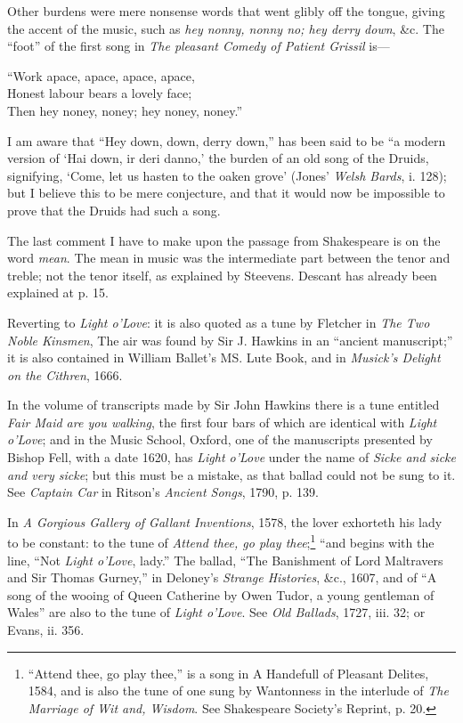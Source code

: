 Other burdens were mere nonsense words that went glibly off the tongue, giving
the accent of the music, such as \textit{hey nonny, nonny no; hey derry down}, \&c. The
“foot” of the first song in \textit{The pleasant Comedy of Patient Grissil} is—
\begin{scverse}
“Work apace, apace, apace, apace,\\
Honest labour bears a lovely face;\\
Then hey noney, noney; hey noney, noney.”
\end{scverse}
I am aware that “Hey down, down, derry down,” has been said to be “a modern
version of ‘Hai down, ir deri danno,’ the burden of an old song of the Druids,
signifying, ‘Come, let us hasten to the oaken grove’ (Jones’ \textit{Welsh Bards}, i. 128);
but I believe this to be mere conjecture, and that it would now be impossible to
prove that the Druids had such a song.

The last comment I have to make upon the passage from Shakespeare is on the
word \textit{mean}. The mean in music was the intermediate part between the tenor and
treble; not the tenor itself, as explained by Steevens. Descant has already been
explained at p. 15.

Reverting to \textit{Light o’Love}: it is also quoted as a tune by Fletcher in \textit{The Two
Noble Kinsmen}, The air was found by Sir J. Hawkins in an “ancient manuscript;” 
it is also contained in William Ballet’s MS. Lute Book, and in \textit{Musick’s
Delight on the Cithren}, 1666.

In the volume of transcripts made by Sir John Hawkins there is a tune entitled
\textit{Fair Maid are you walking}, the first four bars of which are identical with \textit{Light
o'Love}; and in the Music School, Oxford, one of the manuscripts presented by
Bishop Fell, with a date 1620, has \textit{Light o'Love} under the name of \textit{Sicke and sicke
and very sicke}; but this must be a mistake, as that ballad could not be sung to it.
See \textit{Captain Car} in Ritson’s \textit{Ancient Songs}, 1790, p. 139.

In \textit{A Gorgious Gallery of Gallant Inventions}, 1578, the lover exhorteth his
lady to be constant: to the tune of \textit{Attend thee, go play thee};\footnote{\textit{}
“Attend thee, go play thee,” is a song in A Hand\-efull
of Pleasant Delites, 1584, and is also the tune of one sung
by Wantonness in the interlude of \textit{The Marriage of Wit
and, Wisdom}. See Shakespeare Society’s Reprint, p. 20.}
 “and begins with
the line, “Not \textit{Light o'Love}, lady.” The ballad, “The Banishment of Lord Maltravers
and Sir Thomas Gurney,” in Deloney’s \textit{Strange Histories}, \&c., 1607, and of
“A song of the wooing of Queen Catherine by Owen Tudor, a young gentleman
of Wales” are also to the tune of \textit{Light o'Love}. See \textit{Old Ballads}, 1727, iii. 32;
or Evans, ii. 356.

